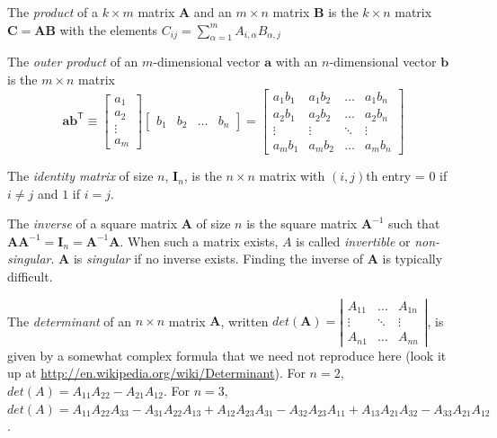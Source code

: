 The {\em product} of a $k \times m$ matrix $\mathbf{A}$ and an $m \times n$ {matrix} $\mathbf{B}$ is
the $k \times n$ matrix $\mathbf{C}=\mathbf{AB}$ with the elements $C_{ij}= \sum\limits_{\alpha=1}^{m}A_{i,\alpha}B_{\alpha,j}$

The {\em outer product} of an $m$-dimensional  vector $\mathbf a$ with an $n$-dimensional vector $\mathbf b$ is the $m \times n$ matrix 
\[
\mathbf{a}\mathbf{b}^{\mathsf{T}}\equiv
\left[\begin{array}{c}a_1\\ a_2 \\ \vdots \\ a_m\end{array}\right]
\left[\begin{array}{cccc}b_1&b_2&\ldots&b_n\end{array}\right] =
\left[\begin{array}{cccc}a_1b_1 & a_1b_2 & \ldots & a_1b_n\\
                                          a_2b_1 & a_2b_2 & \ldots & a_2b_n\\
                                          \vdots    & \vdots     & \ddots & \vdots \\
                                          a_mb_1 & a_mb_2 & \ldots & a_mb_n
                                          \end{array}\right]
\] 

The {\em identity matrix} of size $n$, $\mathbf I_n$, is the $n \times n$ matrix with $(i,j)$th entry = 0 if $i \ne j$ and $1$ if $i = j$.  

The {\em inverse} of a square matrix $\mathbf A$ of size $n$ is the square matrix $\mathbf A^{-1}$ such that $\mathbf{AA}^{-1} = \mathbf I_n = \mathbf A^{-1}\mathbf A$. When such a matrix exists, $A$ is called {\em invertible} or {\em non-singular}. $\mathbf A$ is {\em singular} if no inverse exists.  Finding the inverse of $\mathbf  A$ is typically difficult.

The {\em determinant} of  an $n \times n$ matrix $\mathbf A$, written $det(\mathbf A) = \left| \begin{array}{ccc} A_{11}& \ldots & A_{1n}\\ \vdots &\ddots &\vdots \\ A_{n1}& \ldots &A_{nn} \end{array}\right|$, is given by a somewhat complex formula that we need not reproduce here (look it up at  \url{http://en.wikipedia.org/wiki/Determinant}).  For $n= 2$, $det(A)  = A_{11} A_{22} -  A_{21} A_{12}$.  For $n= 3$, $det(A)  = A_{11}A_{22}A_{33} - A_{31}A_{22}A_{13} + A_{12}A_{23}A_{31} - A_{32}A_{23}A_{11} + A_{13}A_{21}A_{32} - A_{33}A_{21}A_{12}$.

